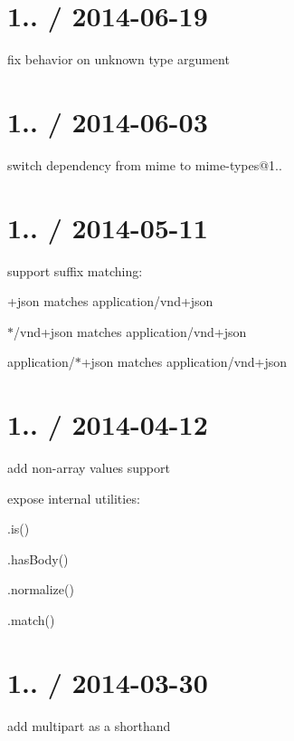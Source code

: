 \section*{1.. / 2014-\/06-\/19 }


\begin{DoxyItemize}
\item fix behavior on unknown type argument
\end{DoxyItemize}

\section*{1.. / 2014-\/06-\/03 }


\begin{DoxyItemize}
\item switch dependency from {\ttfamily mime} to {\ttfamily mime-\/types@1..}
\end{DoxyItemize}

\section*{1.. / 2014-\/05-\/11 }


\begin{DoxyItemize}
\item support suffix matching\+:
\begin{DoxyItemize}
\item {\ttfamily +json} matches {\ttfamily application/vnd+json}
\item {\ttfamily $\ast$/vnd+json} matches {\ttfamily application/vnd+json}
\item {\ttfamily application/$\ast$+json} matches {\ttfamily application/vnd+json}
\end{DoxyItemize}
\end{DoxyItemize}

\section*{1.. / 2014-\/04-\/12 }


\begin{DoxyItemize}
\item add non-\/array values support
\item expose internal utilities\+:
\begin{DoxyItemize}
\item {\ttfamily .is()}
\item {\ttfamily .has\+Body()}
\item {\ttfamily .normalize()}
\item {\ttfamily .match()}
\end{DoxyItemize}
\end{DoxyItemize}

\section*{1.. / 2014-\/03-\/30 }


\begin{DoxyItemize}
\item add {\ttfamily multipart} as a shorthand 
\end{DoxyItemize}